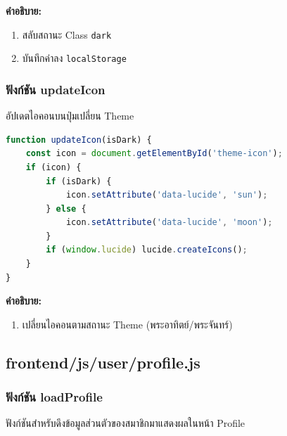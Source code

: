 \textbf{คำอธิบาย:}
\begin{enumerate}
    \item สลับสถานะ Class \texttt{dark}
    \item บันทึกค่าลง \texttt{localStorage}
\end{enumerate}

\subsubsection{ฟังก์ชัน updateIcon}
อัปเดตไอคอนบนปุ่มเปลี่ยน Theme

\begin{lstlisting}[language=JavaScript, caption={ฟังก์ชัน updateIcon ใน theme.js}, label={code:theme-icon-func}]
function updateIcon(isDark) {
    const icon = document.getElementById('theme-icon');
    if (icon) {
        if (isDark) {
            icon.setAttribute('data-lucide', 'sun');
        } else {
            icon.setAttribute('data-lucide', 'moon');
        }
        if (window.lucide) lucide.createIcons();
    }
}
\end{lstlisting}

\textbf{คำอธิบาย:}
\begin{enumerate}
    \item เปลี่ยนไอคอนตามสถานะ Theme (พระอาทิตย์/พระจันทร์)
\end{enumerate}

\subsection{frontend/js/user/profile.js}

\subsubsection{ฟังก์ชัน loadProfile}
ฟังก์ชันสำหรับดึงข้อมูลส่วนตัวของสมาชิกมาแสดงผลในหน้า Profile

